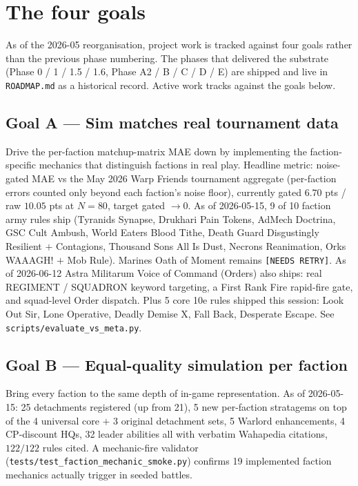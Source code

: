 \documentclass[11pt,a4paper]{article}
\begin{document}
\section{The four goals}
\label{sec:goals}

As of the 2026-05 reorganisation, project work is tracked against four
goals rather than the previous phase numbering. The phases that delivered
the substrate (Phase 0 / 1 / 1.5 / 1.6, Phase A2 / B / C / D / E) are
shipped and live in \texttt{ROADMAP.md} as a historical record. Active
work tracks against the goals below.

\subsection*{Goal A --- Sim matches real tournament data}
Drive the per-faction matchup-matrix MAE down by implementing the
faction-specific mechanics that distinguish factions in real play.
Headline metric: noise-gated MAE vs the May 2026 Warp Friends tournament
aggregate (per-faction errors counted only beyond each faction's noise
floor), currently gated $6.70$ pts / raw $10.05$ pts at $N{=}80$, target
gated $\to 0$. As of 2026-05-15, 9 of 10 faction army
rules ship (Tyranids Synapse, Drukhari Pain Tokens, AdMech Doctrina,
GSC Cult Ambush, World Eaters Blood Tithe, Death Guard Disgustingly
Resilient $+$ Contagions, Thousand Sons All Is Dust, Necrons Reanimation,
Orks WAAAGH! $+$ Mob Rule). Marines Oath of Moment remains
\texttt{[NEEDS RETRY]}. As of 2026-06-12 Astra Militarum Voice of
Command (Orders) also ships: real REGIMENT / SQUADRON keyword targeting,
a First Rank Fire rapid-fire gate, and squad-level Order dispatch. Plus 5 core 10e rules shipped this session:
Look Out Sir, Lone Operative, Deadly Demise X, Fall Back, Desperate
Escape. See \texttt{scripts/evaluate\_vs\_meta.py}.

\subsection*{Goal B --- Equal-quality simulation per faction}
Bring every faction to the same depth of in-game representation. As of
2026-05-15: 25 detachments registered (up from 21), 5 new per-faction
stratagems on top of the 4 universal core $+$ 3 original detachment
sets, 5 Warlord enhancements, 4 CP-discount HQs, 32 leader abilities
all with verbatim Wahapedia citations, $122/122$ rules cited. A
mechanic-fire validator (\texttt{tests/test\_faction\_mechanic\_smoke.py})
confirms 19 implemented faction mechanics actually trigger in seeded
battles.
\end{document}
